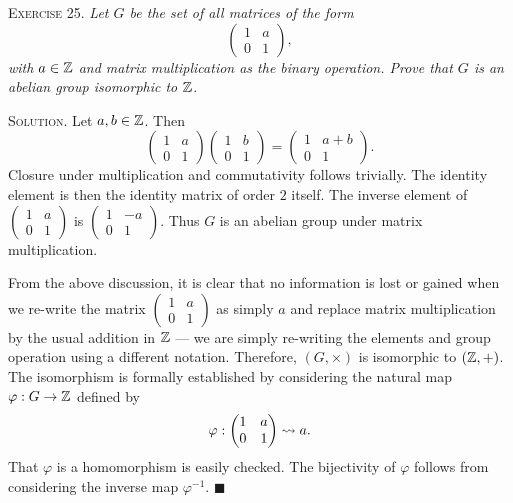 \documentclass[11pt, leqno]{article}
\newcommand{\done}{\ensuremath{\blacksquare}}
\begin{document}
\textsc{Exercise 25}. \emph{Let $G$ be the set of all matrices of the form 
\begin{displaymath}
\begin{pmatrix} 1 & a \\ 0 & 1 \end{pmatrix},
\end{displaymath}
with $a\in\mathbb{Z}$ and matrix multiplication as the binary operation. Prove that $G$ is an abelian group isomorphic to $\mathbb{Z}$.}

\textsc{Solution}. Let $a, b \in \mathbb{Z}$. Then 
\begin{displaymath}
\begin{pmatrix} 1 & a \\ 0 & 1 \end{pmatrix} \begin{pmatrix} 1 & b \\ 0 & 1 \end{pmatrix} = \begin{pmatrix} 1 & a+b \\ 0 & 1 \end{pmatrix}.
\end{displaymath} Closure under multiplication and commutativity follows trivially. The identity element is then the identity matrix of order $2$ itself. The inverse element of $\displaystyle \begin{pmatrix} 1 & a \\ 0 & 1 \end{pmatrix}$ is $\displaystyle \begin{pmatrix} 1 & -a \\ 0 & 1 \end{pmatrix}$. Thus $G$ is an abelian group under matrix multiplication.

From the above discussion, it is clear that no information is lost or gained when we re-write the matrix $\displaystyle \begin{pmatrix} 1 & a \\ 0 & 1 \end{pmatrix}$ as simply $a$ and replace matrix multiplication by the usual addition in $\mathbb{Z}$ --- we are simply re-writing the elements and group operation using a different notation. Therefore, $(G, \times)$ is isomorphic to $(\mathbb{Z}, +)$. The isomorphism is formally established by considering the natural map $\varphi : G \to \mathbb{Z}$ defined by 
\begin{displaymath}
\varphi: \begin{pmatrix} 1 & a \\ 0 & 1 \end{pmatrix} \rightsquigarrow a.
\end{displaymath}
That $\varphi$ is a homomorphism is easily checked. The bijectivity of $\varphi$ follows from considering the inverse map $\varphi^{-1}$. \done
\end{document}
